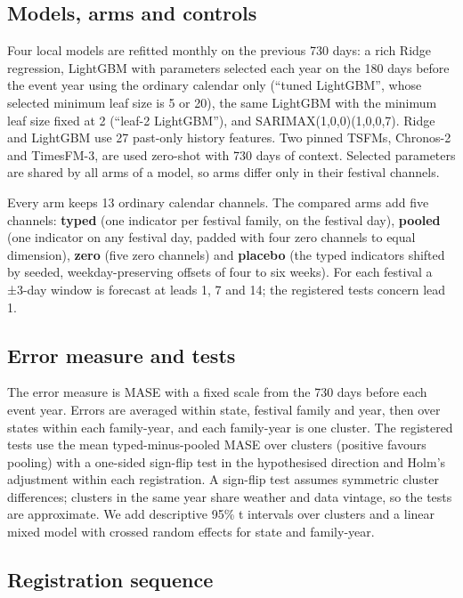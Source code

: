 \documentclass[review,12pt,authoryear]{elsarticle}
\begin{document}
\subsection{Models, arms and controls}

Four local models are refitted monthly on the previous 730 days: a rich Ridge regression, LightGBM \citep{ke2017} with parameters selected each year on the 180 days before the event year using the ordinary calendar only (``tuned LightGBM'', whose selected minimum leaf size is 5 or 20), the same LightGBM with the minimum leaf size fixed at 2 (``leaf-2 LightGBM''), and SARIMAX(1,0,0)(1,0,0,7). Ridge and LightGBM use 27 past-only history features. Two pinned TSFMs, Chronos-2 and TimesFM-3, are used zero-shot with 730 days of context. Selected parameters are shared by all arms of a model, so arms differ only in their festival channels.

Every arm keeps 13 ordinary calendar channels. The compared arms add five channels: \textbf{typed} (one indicator per festival family, on the festival day), \textbf{pooled} (one indicator on any festival day, padded with four zero channels to equal dimension), \textbf{zero} (five zero channels) and \textbf{placebo} (the typed indicators shifted by seeded, weekday-preserving offsets of four to six weeks). For each festival a ±3-day window is forecast at leads 1, 7 and 14; the registered tests concern lead 1.

\subsection{Error measure and tests}

The error measure is MASE \citep{hyndman2006} with a fixed scale from the 730 days before each event year. Errors are averaged within state, festival family and year, then over states within each family-year, and each family-year is one cluster. The registered tests use the mean typed-minus-pooled MASE over clusters (positive favours pooling) with a one-sided sign-flip test in the hypothesised direction and Holm's adjustment within each registration. A sign-flip test assumes symmetric cluster differences; clusters in the same year share weather and data vintage, so the tests are approximate. We add descriptive 95\% t intervals over clusters and a linear mixed model with crossed random effects for state and family-year.

\subsection{Registration sequence}
\end{document}
